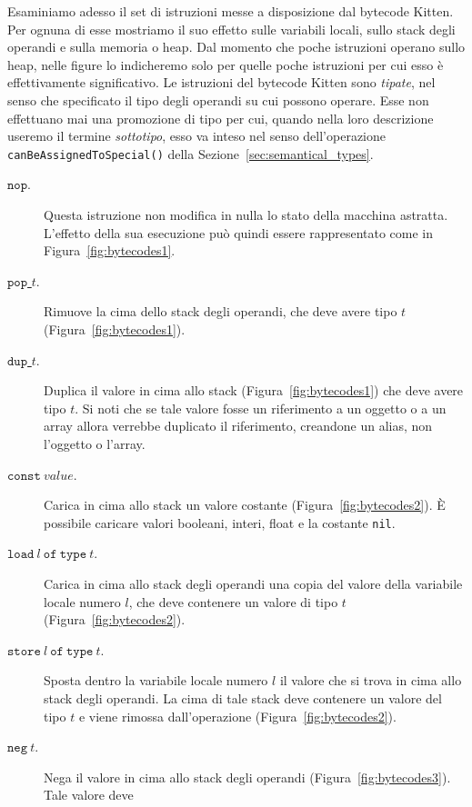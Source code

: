 Esaminiamo adesso il set di istruzioni messe a disposizione dal bytecode
Kitten. Per ognuna di esse mostriamo il suo effetto sulle variabili locali,
sullo stack degli operandi e sulla memoria o heap. Dal momento che
poche istruzioni operano sullo heap, nelle figure lo indicheremo solo per quelle poche
istruzioni per cui esso \`e effettivamente significativo.
Le istruzioni del bytecode Kitten
sono \emph{tipate}, nel senso che \e specificato il tipo
degli operandi su cui possono operare. Esse non effettuano mai una promozione
di tipo per cui, quando nella loro descrizione useremo il termine
\emph{sottotipo}, esso va inteso nel senso dell'operazione
\texttt{canBeAssignedToSpecial()} della Sezione~\ref{sec:semantical_types}.
%
\begin{description}
\item[\underline{$\mathtt{nop}$}.] Questa istruzione non modifica in nulla
  lo stato della macchina astratta. L'effetto della sua esecuzione pu\`o
  quindi essere rappresentato come in Figura~\ref{fig:bytecodes1}.
\item[\underline{$\mathtt{pop}$ $t$}.]
  Rimuove la cima dello stack degli operandi, che deve avere tipo $t$
  (Figura~\ref{fig:bytecodes1}).
\item[\underline{$\mathtt{dup}$ $t$}.] Duplica il valore in cima allo stack
  (Figura~\ref{fig:bytecodes1}) che deve avere tipo $t$.
  Si noti che se tale valore fosse un
  riferimento a un oggetto o a un array allora verrebbe duplicato il
  riferimento, creandone un alias, non l'oggetto o l'array.
\item[\underline{$\mathtt{const}\ \mathit{value}$}.]
  Carica in cima allo stack un valore
  costante (Figura~\ref{fig:bytecodes2}).
  \`E possibile caricare valori booleani, interi, float e la
  costante \texttt{nil}.
\item[\underline{$\mathtt{load\ \mathit{l}\ of\ type\ \mathit{t}}$}.]
  Carica in cima allo stack degli operandi
  una copia del valore della variabile locale
  numero $l$, che deve contenere un valore di tipo $t$
  (Figura~\ref{fig:bytecodes2}).
\item[\underline{$\mathtt{store\ \mathit{l}\ of\ type\ \mathit{t}}$}.]
  Sposta dentro la variabile locale numero $l$ il valore che si trova
  in cima allo stack degli operandi. La cima di tale stack deve contenere un
  valore del tipo $t$ e viene rimossa dall'operazione
  (Figura~\ref{fig:bytecodes2}).
\item[\underline{$\mathtt{neg\ \mathit{t}}$}.]
  Nega il valore in cima allo stack degli operandi
  (Figura~\ref{fig:bytecodes3}). Tale valore deve

\end{description}
